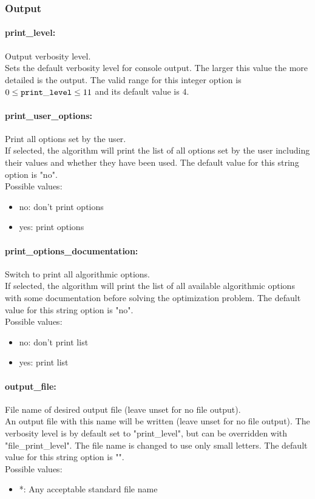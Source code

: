 \subsubsection{Output}

\paragraph{print\_level:} Output verbosity level. $\;$ \\
 Sets the default verbosity level for console
output. The larger this value the more detailed
is the output. The valid range for this integer option is
$0 \le {\tt print\_level } \le 11$
and its default value is $4$.


\paragraph{print\_user\_options:} Print all options set by the user. $\;$ \\
 If selected, the algorithm will print the list of
all options set by the user including their
values and whether they have been used.
The default value for this string option is "no".
\\ 
Possible values:
\begin{itemize}
   \item no: don't print options
   \item yes: print options
\end{itemize}

\paragraph{print\_options\_documentation:} Switch to print all algorithmic options. $\;$ \\
 If selected, the algorithm will print the list of
all available algorithmic options with some
documentation before solving the optimization
problem.
The default value for this string option is "no".
\\ 
Possible values:
\begin{itemize}
   \item no: don't print list
   \item yes: print list
\end{itemize}

\paragraph{output\_file:} File name of desired output file (leave unset for no file output). $\;$ \\
An output file with this
name will be written (leave unset for no file
output).  The verbosity level is by default set
to "print\_level", but can be overridden with
"file\_print\_level".  The file name is changed
to use only small letters.
The default value for this string option is "".
\\ 
Possible values:
\begin{itemize}
   \item *: Any acceptable standard file name
\end{itemize}


